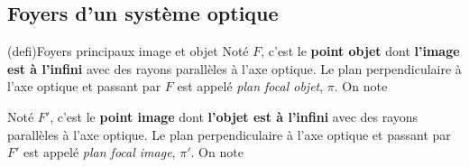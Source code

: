 \documentclass[../../main/main.tex]{subfiles}
\begin{document}
\vspace{-15pt}
\subsection{Foyers d'un système optique}

\begin{tcb*}[label=def:foy, sidebyside, sidebyside align=top](defi){Foyers
			principaux image et objet}
	Noté $F$, c'est le \textbf{point objet} dont \textbf{l'image est à l'infini}
	avec des rayons parallèles à l'axe optique.
	\smallbreak
	Le plan perpendiculaire à l'axe optique et passant par $F$ est appelé
	\textit{plan focal objet}, $\pi$. On note
	\smallbreak
	\begin{center}
	\end{center}
	\tcblower
	Noté $F'$, c'est le \textbf{point image} dont \textbf{l'objet est à l'infini}
	avec des rayons parallèles à l'axe optique.
	\smallbreak
	Le plan perpendiculaire à l'axe optique
	et passant par $F'$ est appelé \textit{plan focal image}, $\pi'$. On note
	\smallbreak
	\begin{center}
	\end{center}
\end{tcb*}
\end{document}
